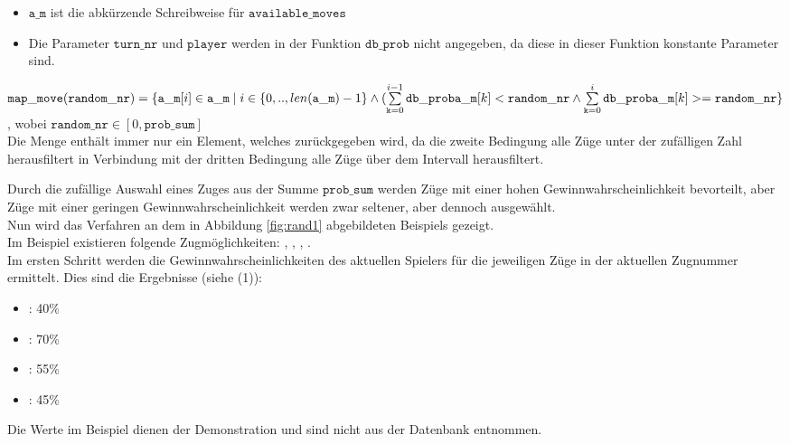 \begin{itemize}
\begin{itemize}
\item $\mathtt{a\_m}$ ist die abkürzende Schreibweise für $\mathtt{available\_moves}$
\item Die Parameter $\mathtt{turn\_nr}$ und $\mathtt{player}$ werden in der Funktion $\mathtt{db\_prob}$ nicht angegeben, da diese in dieser Funktion konstante Parameter sind.
\end{itemize}
\vspace{0.25cm}
$\mathtt{map\_move}(\mathtt{random\_nr}) = \{ \mathtt{a\_m}[i] \in \mathtt{a\_m} \mid  \\i \in \{0, .. , len(\mathtt{a\_m}) - 1\} \land (\sum\limits_{\mathtt{k} = 0}^{i - 1}{\mathtt{db\_prob}\mathtt{a\_m}[k] < \mathtt{random\_nr}} \\\land \sum\limits_{\mathtt{k} = 0}^{i}{\mathtt{db\_prob}\mathtt{a\_m}[k] >= \mathtt{random\_nr}}  \}$, wobei $\mathtt{random\_nr} \in [0, \mathtt{prob\_sum}]$
\vspace{0.25cm}\\Die Menge enthält immer nur ein Element, welches zurückgegeben wird, da die zweite Bedingung alle Züge unter der zufälligen Zahl herausfiltert in Verbindung mit der dritten Bedingung alle Züge über dem Intervall herausfiltert.
\end{itemize}
Durch die zufällige Auswahl eines Zuges aus der Summe $\mathtt{prob\_sum}$ werden Züge mit einer hohen Gewinnwahrscheinlichkeit bevorteilt, aber Züge mit einer geringen Gewinnwahrscheinlichkeit werden zwar seltener, aber dennoch ausgewählt.
\\Nun wird das Verfahren an dem in Abbildung \ref{fig:rand1} abgebildeten Beispiels gezeigt.
\vspace{0,5cm}
\\
Im Beispiel existieren folgende Zugmöglichkeiten: , , , .
\\Im ersten Schritt werden die Gewinnwahrscheinlichkeiten des aktuellen Spielers für die jeweiligen Züge in der aktuellen Zugnummer ermittelt. Dies sind die Ergebnisse (siehe (1)):
\begin{itemize}
\item {}: 40\%
\item {}: 70\%
\item {}: 55\%
\item {}: 45\%
\end{itemize}
Die Werte im Beispiel dienen der Demonstration und sind nicht aus der Datenbank entnommen.
